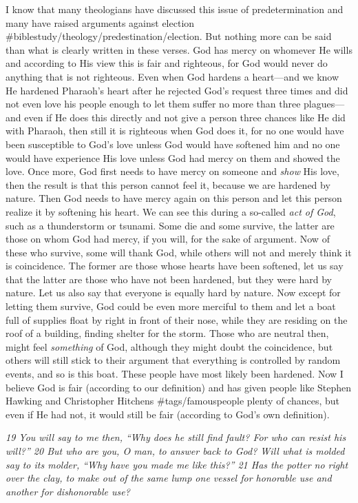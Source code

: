 I know that many theologians have discussed this issue of
predetermination and many have raised arguments against election
\#biblestudy/theology/predestination/election. But nothing more can be
said than what is clearly written in these verses. God has mercy on
whomever He wills and according to His view this is fair and righteous,
for God would never do anything that is not righteous. Even when God
hardens a heart---and we know He hardened Pharaoh's heart after he
rejected God's request three times and did not even love his people
enough to let them suffer no more than three plagues---and even if He
does this directly and not give a person three chances like He did with
Pharaoh, then still it is righteous when God does it, for no one would
have been susceptible to God's love unless God would have softened him
and no one would have experience His love unless God had mercy on them
and showed the love. Once more, God first needs to have mercy on someone
and \emph{show} His love, then the result is that this person cannot
feel it, because we are hardened by nature. Then God needs to have mercy
again on this person and let this person realize it by softening his
heart. We can see this during a so-called \emph{act of God}, such as a
thunderstorm or tsunami. Some die and some survive, the latter are those
on whom God had mercy, if you will, for the sake of argument. Now of
these who survive, some will thank God, while others will not and merely
think it is coincidence. The former are those whose hearts have been
softened, let us say that the latter are those who have not been
hardened, but they were hard by nature. Let us also say that everyone is
equally hard by nature. Now except for letting them survive, God could
be even more merciful to them and let a boat full of supplies float by
right in front of their nose, while they are residing on the roof of a
building, finding shelter for the storm. Those who are neutral then,
might feel \emph{something} of God, although they might doubt the
coincidence, but others will still stick to their argument that
everything is controlled by random events, and so is this boat. These
people have most likely been hardened. Now I believe God is fair
(according to our definition) and has given people like Stephen Hawking
and Christopher Hitchens \#tags/famouspeople plenty of chances, but even
if He had not, it would still be fair (according to God's own
definition).

\emph{19 You will say to me then, ``Why does he still find fault? For
who can resist his will?'' 20 But who are you, O man, to answer back to
God? Will what is molded say to its molder, ``Why have you made me like
this?'' 21 Has the potter no right over the clay, to make out of the
same lump one vessel for honorable use and another for dishonorable
use?}

